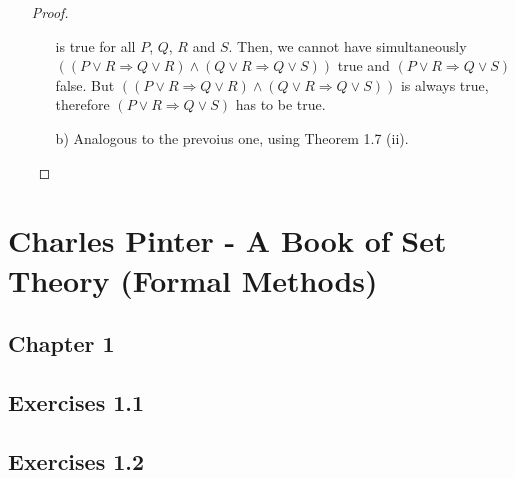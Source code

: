 \documentclass{article}
\begin{document}
\begin{enumerate}
\begin{proof}
\begin{enumerate}
			  is true for all $P$, $Q$, $R$ and $S$. Then, we cannot have simultaneously $((P \lor R \Rightarrow Q \lor R) \land (Q \lor R \Rightarrow Q \lor S))$ true and $(P \lor R \Rightarrow Q \lor S)$ false. But $((P \lor R \Rightarrow Q \lor R) \land (Q \lor R \Rightarrow Q \lor S))$ is always true, therefore $(P \lor R \Rightarrow Q \lor S)$ has to be true.
			  
			  \item[b)] Analogous to the prevoius one, using Theorem 1.7 (ii).
			\end{enumerate}
			
		\end{proof}
		
		
			
	\end{enumerate}
	
  \section*{Charles Pinter - A Book of Set Theory (Formal Methods)}
	\subsection*{Chapter 1}
	\par\bigskip
	\subsection*{Exercises 1.1}
  
  
  
  
  
  

 \subsection*{Exercises 1.2}
		 
\end{document}
